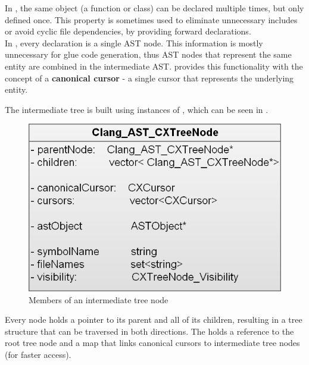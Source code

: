 In , the same object (a function or class) can be declared multiple times, but only defined once. This property is sometimes used to eliminate unnecessary includes or avoid cyclic file dependencies, by providing forward declarations.\\
In , every declaration is a single AST node. This information is mostly unnecessary for glue code generation, thus AST nodes that represent the same  entity are combined in the intermediate AST.  provides this functionality with the concept of a \textbf{canonical cursor} - a single cursor that represents the underlying entity.

The intermediate tree is built using instances of , which can be seen in . 

\begin{figure}[h] %
	\centering
		\includegraphics[scale=0.3]{Images/CXTreeNode.png}
	\caption{Members of an intermediate tree node}
	\label{fig:CXTreeNode}
\end{figure}

Every node holds a pointer to its parent and all of its children, resulting in a tree structure that can be traversed in both directions. 
The  holds a reference to the root tree node and a map that links canonical cursors to intermediate tree nodes (for faster access).


